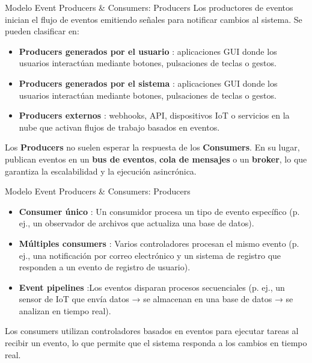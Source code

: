 \documentclass[11pt]{beamer}
\begin{document}
	\begin{frame}{Modelo Event Producers \& Consumers: Producers}
	\small
	Los productores de eventos inician el flujo de eventos emitiendo señales para notificar cambios al sistema. Se pueden clasificar en:
	
	\begin{itemize}
	\item \textbf{Producers generados por el usuario} : aplicaciones GUI donde los usuarios interactúan mediante botones, pulsaciones de teclas o gestos.
	\item \textbf{Producers generados por el sistema} : aplicaciones GUI donde los usuarios interactúan mediante botones, pulsaciones de teclas o gestos.
	\item \textbf{Producers externos} : webhooks, API, dispositivos IoT o servicios en la nube que activan flujos de trabajo basados en eventos.
	\end{itemize} 
	\vspace{1cm}
	Los \textbf{Producers} no suelen esperar la respuesta de los \textbf{Consumers}. En su lugar, publican eventos en un \textbf{bus de eventos}, \textbf{cola de mensajes} o un \textbf{broker}, lo que garantiza la escalabilidad y la ejecución asincrónica.

	\end{frame}

	\begin{frame}{Modelo Event Producers \& Consumers: Producers}
	\small
	\begin{itemize}
		\item \textbf{Consumer único} : Un consumidor procesa un tipo de evento específico (p. ej., un observador de archivos que actualiza una base de datos).
		\item \textbf{Múltiples consumers} : Varios controladores procesan el mismo evento (p. ej., una notificación por correo electrónico y un sistema de registro que responden a un evento de registro de usuario).
		\item \textbf{Event pipelines} :Los eventos disparan procesos secuenciales (p. ej., un sensor de IoT que envía datos → se almacenan en una base de datos → se analizan en tiempo real).
	\end{itemize} 
	\vspace{1cm}
	Los consumers utilizan controladores basados en eventos para ejecutar tareas al recibir un evento, lo que permite que el sistema responda a los cambios en tiempo real.
	\end{frame}
	
\end{document}
